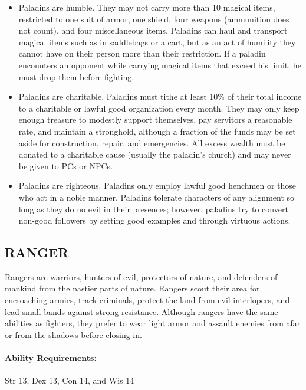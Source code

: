 \begin{multicols}{2}
\begin{itemize}
\item Paladins are humble.  They may not carry more than 10 magical items, restricted to one suit of armor, one shield, four weapons (ammunition does not count), and four miscellaneous items.  Paladins can haul and transport magical items such as in saddlebags or a cart, but as an act of humility they cannot have on their person more than their restriction.  If a paladin encounters an opponent while carrying magical items that exceed his limit, he must drop them before fighting.

\item Paladins are charitable.  Paladins must tithe at least 10\% of their total income to a charitable or lawful good organization every month. They may only keep enough treasure to modestly support themselves, pay servitors a reasonable rate, and maintain a stronghold, although a fraction of the funds may be set aside for construction, repair, and emergencies.  All excess wealth must be donated to a charitable cause (usually the paladin's church) and may never be given to PCs or NPCs.

\item Paladins are righteous.  Paladins only employ lawful good henchmen or those who act in a noble manner.  Paladins tolerate characters of any alignment so long as they do no evil in their presences; however, paladins try to convert non-good followers by setting good examples and through virtuous actions.  

\end{itemize}

\subsection{RANGER}

Rangers are warriors, hunters of evil, protectors of nature, and defenders of mankind from the nastier parts of nature.  Rangers scout their area for encroaching armies, track criminals, protect the land from evil interlopers, and lead small bands against strong resistance.  Although rangers have the same abilities as fighters, they prefer to wear light armor and assault enemies from afar or from the shadows before closing in.

\paragraph{Ability Requirements:} Str 13, Dex 13, Con 14, and Wis 14


\end{multicols}

